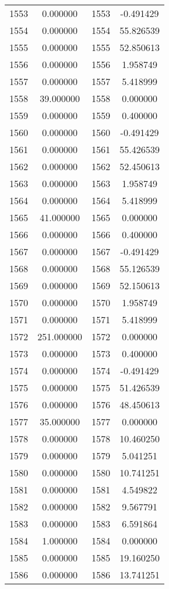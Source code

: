 \documentclass[12pt]{article}
\begin{document}
\begin{longtable}{@{}cccc@{}}
1553 & 0.000000 & 1553 & -0.491429 \\
1554 & 0.000000 & 1554 & 55.826539 \\
1555 & 0.000000 & 1555 & 52.850613 \\
1556 & 0.000000 & 1556 & 1.958749 \\
1557 & 0.000000 & 1557 & 5.418999 \\
1558 & 39.000000 & 1558 & 0.000000 \\
1559 & 0.000000 & 1559 & 0.400000 \\
1560 & 0.000000 & 1560 & -0.491429 \\
1561 & 0.000000 & 1561 & 55.426539 \\
1562 & 0.000000 & 1562 & 52.450613 \\
1563 & 0.000000 & 1563 & 1.958749 \\
1564 & 0.000000 & 1564 & 5.418999 \\
1565 & 41.000000 & 1565 & 0.000000 \\
1566 & 0.000000 & 1566 & 0.400000 \\
1567 & 0.000000 & 1567 & -0.491429 \\
1568 & 0.000000 & 1568 & 55.126539 \\
1569 & 0.000000 & 1569 & 52.150613 \\
1570 & 0.000000 & 1570 & 1.958749 \\
1571 & 0.000000 & 1571 & 5.418999 \\
1572 & 251.000000 & 1572 & 0.000000 \\
1573 & 0.000000 & 1573 & 0.400000 \\
1574 & 0.000000 & 1574 & -0.491429 \\
1575 & 0.000000 & 1575 & 51.426539 \\
1576 & 0.000000 & 1576 & 48.450613 \\
1577 & 35.000000 & 1577 & 0.000000 \\
1578 & 0.000000 & 1578 & 10.460250 \\
1579 & 0.000000 & 1579 & 5.041251 \\
1580 & 0.000000 & 1580 & 10.741251 \\
1581 & 0.000000 & 1581 & 4.549822 \\
1582 & 0.000000 & 1582 & 9.567791 \\
1583 & 0.000000 & 1583 & 6.591864 \\
1584 & 1.000000 & 1584 & 0.000000 \\
1585 & 0.000000 & 1585 & 19.160250 \\
1586 & 0.000000 & 1586 & 13.741251 \\

\end{longtable}
\end{document}
